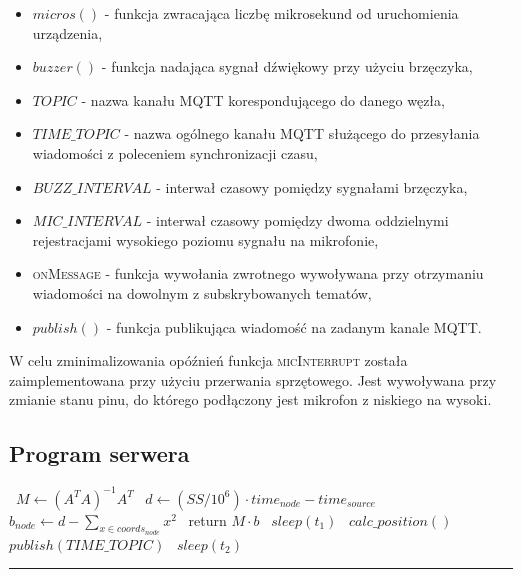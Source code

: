 \begin{itemize}
    \item $micros()$ {-} funkcja zwracająca liczbę mikrosekund od uruchomienia urządzenia,
    \item $buzzer()$ {-} funkcja nadająca sygnał dźwiękowy przy użyciu brzęczyka,
    \item $TOPIC$ {-} nazwa kanału MQTT korespondującego do danego węzła,
    \item $TIME\_TOPIC$ {-} nazwa ogólnego kanału MQTT służącego do przesyłania wiadomości z poleceniem synchronizacji czasu,
    \item $BUZZ\_INTERVAL$ {-} interwał czasowy pomiędzy sygnałami brzęczyka,
    \item $MIC\_INTERVAL$ {-} interwał czasowy pomiędzy dwoma oddzielnymi rejestracjami wysokiego poziomu sygnału na mikrofonie,
    \item \textsc{onMessage} {-} funkcja wywołania zwrotnego wywoływana przy otrzymaniu wiadomości na dowolnym z subskrybowanych tematów,
    \item $publish()$ {-} funkcja publikująca wiadomość na zadanym kanale MQTT.
\end{itemize}

W celu zminimalizowania opóźnień funkcja \textsc{micInterrupt} została zaimplementowana przy użyciu przerwania sprzętowego. Jest wywoływana przy zmianie stanu pinu, do którego podłączony jest mikrofon z niskiego na wysoki.

\subsection{Program serwera}

\begin{center}
    \label{alg:server}
    \begin{algorithmic}[1]
        \State\ $M \gets {\left(A^T A\right)}^{-1} A^T$
                \State\ $d \gets (SS / 10^{6}) \cdot time_{node} - time_{source}$
                \State\ $b_{node} \gets d - \sum_{x \in coords_{node}}{x^2}$
            \EndFor
            \State\ return $M \cdot b$
        \EndFunction
            \State\ $sleep(t_1)$
            \State\ $calc\_position()$
        \EndLoop
            \State\ $publish(TIME\_TOPIC)$
            \State\ $sleep(t_2)$
        \EndLoop
    \end{algorithmic}
    \vspace{5pt}
    \hrule
\end{center}

